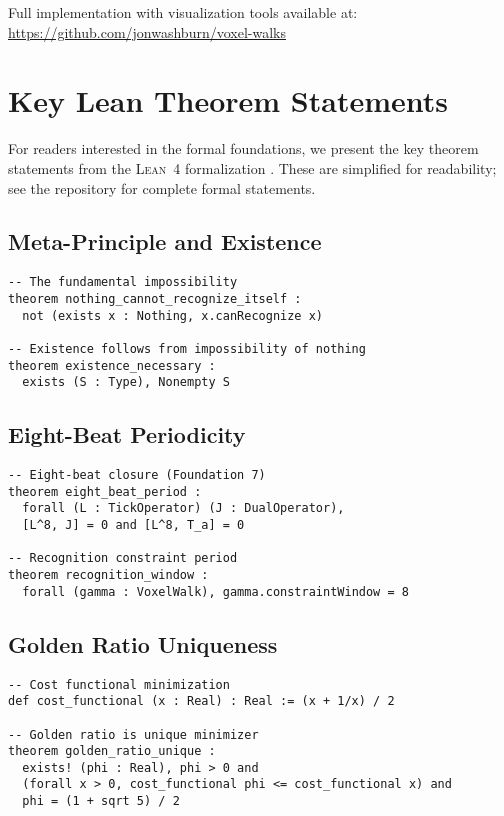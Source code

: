 \documentclass[11pt,a4paper]{article}
\theoremstyle{definition}
\theoremstyle{remark}
\begin{document}
Full implementation with visualization tools available at: \\
\url{https://github.com/jonwashburn/voxel-walks}

\section{Key Lean Theorem Statements}
\label{app:lean}

For readers interested in the formal foundations, we present the key theorem statements from the \textsc{Lean~4} formalization \cite{Washburn2025Lean}. These are simplified for readability; see the repository for complete formal statements.

\subsection{Meta-Principle and Existence}

\begin{verbatim}
-- The fundamental impossibility
theorem nothing_cannot_recognize_itself : 
  not (exists x : Nothing, x.canRecognize x)

-- Existence follows from impossibility of nothing
theorem existence_necessary : 
  exists (S : Type), Nonempty S
\end{verbatim}

\subsection{Eight-Beat Periodicity}

\begin{verbatim}
-- Eight-beat closure (Foundation 7)
theorem eight_beat_period :
  forall (L : TickOperator) (J : DualOperator),
  [L^8, J] = 0 and [L^8, T_a] = 0

-- Recognition constraint period
theorem recognition_window :
  forall (gamma : VoxelWalk), gamma.constraintWindow = 8
\end{verbatim}

\subsection{Golden Ratio Uniqueness}

\begin{verbatim}
-- Cost functional minimization
def cost_functional (x : Real) : Real := (x + 1/x) / 2

-- Golden ratio is unique minimizer
theorem golden_ratio_unique :
  exists! (phi : Real), phi > 0 and 
  (forall x > 0, cost_functional phi <= cost_functional x) and
  phi = (1 + sqrt 5) / 2
\end{verbatim}
\end{document}
